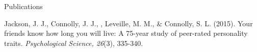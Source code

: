 \begin{rSection}{\textrm{Publications}}
\begin{etaremune}
%
\item Jackson, J. J., Connolly, J. J., \meb, Leveille, M. M., \& Connolly, S. L. (2015). Your friends know how long you will live: A 75-year study of peer-rated personality traits. \textit{Psychological Science, 26}(3), 335-340.\\ \href{http://pss.sagepub.com/content/26/3/335}{\color{blue}{doi:10.1177/0956797614561800}}
\end{etaremune}\end{rSection}%